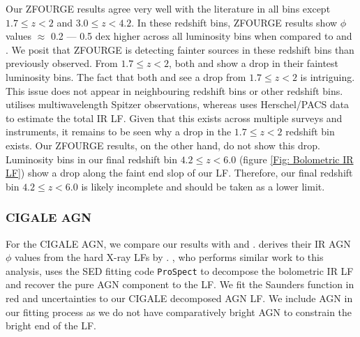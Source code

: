 Our ZFOURGE results agree very well with the literature in all bins except $1.7 \leq z < 2$ and $3.0 \leq z < 4.2$. In these redshift bins, ZFOURGE results show $\phi$ values $\approx$ 0.2 --- 0.5 dex higher across all luminosity bins when compared to \cite{rodighiero_mid-_2010} and \cite{gruppioni_herschel_2013}. We posit that ZFOURGE is detecting fainter sources in these redshift bins than previously observed. From $1.7 \leq z < 2$, both \cite{rodighiero_mid-_2010} and \cite{gruppioni_herschel_2013} show a drop in their faintest luminosity bins. The fact that both \cite{gruppioni_herschel_2013} and \cite{rodighiero_mid-_2010} see a drop from $1.7 \leq z < 2$ is intriguing. This issue does not appear in neighbouring redshift bins or other redshift bins. \cite{rodighiero_mid-_2010} utilises multiwavelength Spitzer observations, whereas \cite{gruppioni_herschel_2013} uses Herschel/PACS data to estimate the total IR LF. Given that this exists across multiple surveys and instruments, it remains to be seen why a drop in the $1.7 \leq z < 2$ redshift bin exists. Our ZFOURGE results, on the other hand, do not show this drop. Luminosity bins in our final redshift bin $4.2 \leq z < 6.0$ (figure \ref{Fig: Bolometric IR LF}) show a drop along the faint end slop of our LF. Therefore, our final redshift bin $4.2 \leq z < 6.0$ is likely incomplete and should be taken as a lower limit.

\subsubsection{CIGALE AGN}
For the CIGALE AGN, we compare our results with \cite{delvecchio_tracing_2014, symeonidis_agn_2021} and \cite{thorne_deep_2022}. \cite{symeonidis_agn_2021} derives their IR AGN $\phi$ values from the hard X-ray LFs by \cite{aird_evolution_2015}. \cite{thorne_deep_2022}, who performs similar work to this analysis, uses the SED fitting code \texttt{ProSpect} \citep{leja_deriving_2017, robotham_prospect_2020} to decompose the bolometric IR LF and recover the pure AGN component to the LF. We fit the Saunders function in red and uncertainties to our CIGALE decomposed AGN LF. We include \cite{thorne_deep_2022} AGN in our fitting process as we do not have comparatively bright AGN to constrain the bright end of the LF. 

